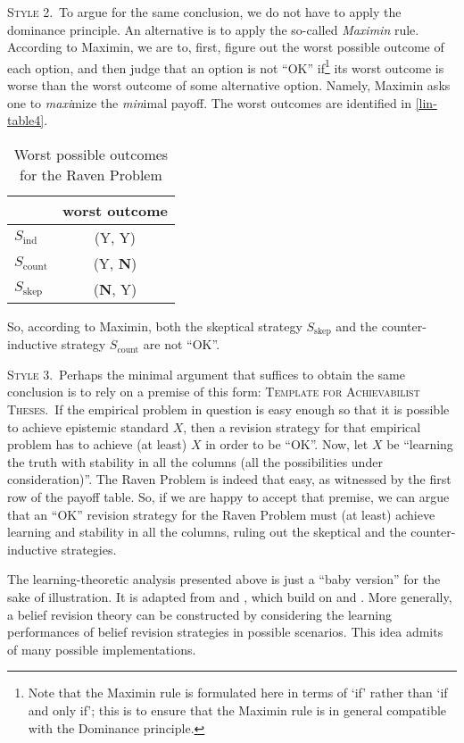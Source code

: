 \textsc{Style 2.}\, To argue for the same conclusion, we do not have to apply the dominance principle. An alternative is to apply the so-called {\em Maximin} rule. According to Maximin, we are to, first, figure out the worst possible outcome of each option, and then judge that an option is not ``OK'' if\footnote
	{Note that the Maximin rule is formulated here in terms of `if' rather than `if and only if'; this is to ensure that the Maximin rule is in general compatible with the Dominance principle.} 
its worst outcome is worse than the worst outcome of some alternative option. Namely, Maximin asks one to {\em maxi}mize the {\em min}imal payoff. The worst outcomes are identified in \autoref{lin-table4}.
\begin{table}[ht]
\centering
\begin{tabular}{lc}
	\hline
	& worst outcome
\\ \hline\hline
  	$S_{\textrm{ind}}$ & (Y, Y) \\
  	$S_{\textrm{count}}$ & (Y, \textbf{N}) \\
		$S_{\textrm{skep}}$ & (\textbf{N}, Y) \\
	\hline
\end{tabular}
\caption{Worst possible outcomes for the Raven Problem}\label{lin-table4}
\end{table}
So, according to Maximin, both the skeptical strategy $S_{\textrm{skep}}$ and the counter-inductive strategy $S_{\textrm{count}}$ are not ``OK''. 

\textsc{Style 3.}\, Perhaps the minimal argument that suffices to obtain the same conclusion is to rely on a premise of this form:
	\op 
	\xm \textsc{Template for Achievabilist Theses.}\, If the empirical problem in question is easy enough so that it is possible to achieve epistemic standard $X$, then a revision strategy for that empirical problem has to achieve (at least) $X$ in order to be ``OK''. 
	\ed 
Now, let $X$ be ``learning the truth with stability in all the columns (all the possibilities under consideration)''. The Raven Problem is indeed that easy, as witnessed by the first row of the payoff table. So, if we are happy to accept that premise, we can argue that an ``OK'' revision strategy for the Raven Problem must (at least) achieve learning and stability in all the columns, ruling out the skeptical and the counter-inductive strategies. 


The learning-theoretic analysis presented above is just a ``baby version'' for the sake of illustration. It is adapted from \citet{genin2015theory} and \citet*{kelly2016realism}, which build on \citet{schulte1999means} and \citet{kelly2007simplicity}. More generally, a belief revision theory can be constructed by considering the learning performances of belief revision strategies in possible scenarios. This idea admits of many possible implementations. \op

